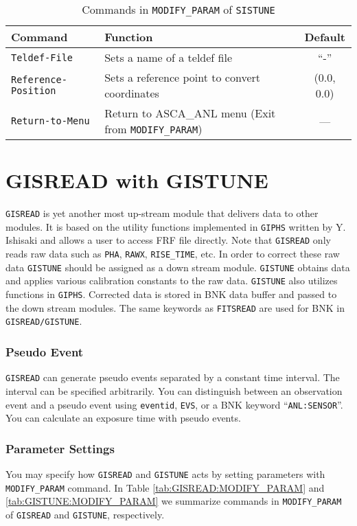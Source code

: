 \begin{table}[htb]
\begin{minipage}{\textwidth}
\begin{center}
\begin{tabular}{|l|l|c|}
\hline
Command & Function & Default \\ \hline
{\tt Teldef-File}
	& Sets a name of a teldef file
	& ``-'' \\
{\tt Reference-Position}
	& Sets a reference point to convert coordinates
	& (0.0, 0.0) \\
{\tt Return-to-Menu}
	& Return to ASCA\_ANL menu (Exit from {\tt MODIFY\_PARAM})
	& --- \\ \hline
\end{tabular}
\end{center}
\end{minipage}
\caption{Commands in {\tt MODIFY\_PARAM} of {\tt SISTUNE}}
\label{tab:SISTUNE:MODIFY_PARAM}
\end{table}

\section{GISREAD with GISTUNE}\label{sec:GISREAD}
{\tt GISREAD} is yet another most up-stream module
that delivers data to other modules.
It is based on the utility functions
implemented in {\tt GIPHS} written by Y. Ishisaki
and allows a user to access FRF file directly.
Note that
{\tt GISREAD} only reads raw data
such as {\tt PHA}, {\tt RAWX}, {\tt RISE\_TIME}, etc.
In order to correct these raw data
{\tt GISTUNE} should be assigned as a down stream module.
{\tt GISTUNE} obtains data
and applies various calibration constants to the raw data.
{\tt GISTUNE} also utilizes functions in {\tt GIPHS}.
Corrected data is stored in BNK data buffer
and passed to the down stream modules.
The same keywords as {\tt FITSREAD}
are used for BNK in {\tt GISREAD/GISTUNE}.

\subsubsection{Pseudo Event}
{\tt GISREAD} can generate pseudo events separated by a constant time interval.
The interval can be specified arbitrarily.
You can distinguish between an observation event and a pseudo event
using {\tt eventid}, {\tt EVS}, or a BNK keyword ``{\tt ANL:SENSOR}''.
You can calculate an exposure time with pseudo events.

\subsubsection{Parameter Settings}
You may specify how {\tt GISREAD} and {\tt GISTUNE} acts
by setting parameters with {\tt MODIFY\_PARAM} command.
In Table \ref{tab:GISREAD:MODIFY_PARAM} and \ref{tab:GISTUNE:MODIFY_PARAM}
we summarize commands
in {\tt MODIFY\_PARAM} of {\tt GISREAD} and {\tt GISTUNE}, respectively.

